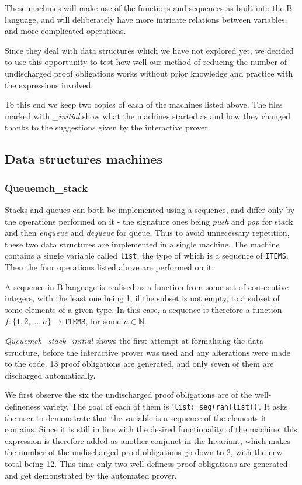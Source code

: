 \documentclass[11pt,journal]{IEEEtran}
\begin{document}
	These machines will make use of the functions and sequences as built into the B language, and will deliberately have more intricate relations between variables, and more complicated operations.
	
	Since they deal with data structures which we have not explored yet, we decided to use this opportunity to test how well our method of reducing the number of undischarged proof obligations works without prior knowledge and practice with the expressions involved. 
	
	To this end we keep two copies of each of the machines listed above. The files marked with \emph{\_initial} show what the machines started as and how they changed thanks to the suggestions given by the interactive prover.
	
	\subsection{Data structures machines}
	\subsubsection{Queuemch\_stack} 
	
	Stacks and queues can both be implemented using a sequence, and differ only by the operations performed on it - the signature ones being \textit{push} and \textit{pop} for stack and then \textit{enqueue} and \textit{dequeue} for queue. Thus to avoid unnecessary repetition, these two data structures are implemented in a single machine. The machine contains a single variable called \texttt{list}, the type of which is a sequence of \texttt{ITEMS}. Then the four operations listed above are performed on it.
	
	A sequence in B language is realised as a function from some set of consecutive integers, with the least one being 1, if the subset is not empty, to a subset of some elements of a given type. In this case, a sequence is therefore a function $f:\{1,2,...,n\} \rightarrow \texttt{ITEMS}$, for some $n \in \mathbb{N}$.

	\emph{Queuemch\_stack\_initial} shows the first attempt at formalising the data structure, before the interactive prover was used and any alterations were made to the code. 13 proof obligations are generated, and only seven of them are discharged automatically.
	
	We first observe the six the undischarged proof obligations are of the well-defineness variety. The goal of each of them is '\texttt{list: seq(ran(list))}'. It asks the user to demonstrate that the variable is a sequence of the elements it contains. Since it is still in line with the desired functionality of the machine, this expression is therefore added as another conjunct in the Invariant, which makes the number of the undischarged proof obligations go down to 2, with the new total being 12. This time only two well-definess proof obligations are generated and get demonstrated by the automated prover. 
	
\end{document}
